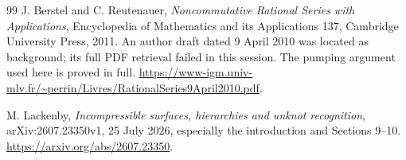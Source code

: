 \documentclass[11pt,a4paper]{article}
\theoremstyle{definition}
\begin{document}
\begin{thebibliography}{99}
J. Berstel and C. Reutenauer, \emph{Noncommutative Rational Series with Applications}, Encyclopedia of Mathematics and its Applications 137, Cambridge University Press, 2011. An author draft dated 9 April 2010 was located as background; its full PDF retrieval failed in this session. The pumping argument used here is proved in full.\newline
\url{https://www-igm.univ-mlv.fr/~perrin/Livres/RationalSeries9April2010.pdf}.

M. Lackenby, \emph{Incompressible surfaces, hierarchies and unknot recognition}, arXiv:2607.23350v1, 25 July 2026, especially the introduction and Sections 9--10.\newline
\url{https://arxiv.org/abs/2607.23350}.
\end{thebibliography}
\end{document}
